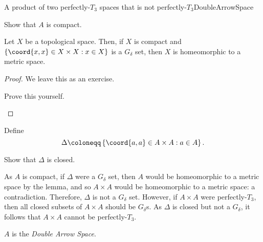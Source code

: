 \begin{exm}{A product of two perfectly-$T_3$ spaces that is not perfectly-$T_3$}{DoubleArrowSpace}
\begin{exr}{}{}
Show that $A$ is compact.
\end{exr}
\begin{lma}{}{}
Let $X$ be a topological space.  Then, if $X$ is compact and $\left\{ \coord{x,x}\in X\times X:x\in X\right\}$ is a $G_{\delta}$ set, then $X$ is homeomorphic to a metric space.
\begin{proof}
We leave this as an exercise.
\begin{exr}{}{}
Prove this yourself.
\end{exr}
\end{proof}
\end{lma}
Define
\begin{equation}
\Delta \coloneqq \left\{ \coord{a,a}\in A\times A:a\in A\right\} .
\end{equation}
\begin{exr}{}{}
Show that $\Delta$ is closed.
\end{exr}
As $A$ is compact, if $\Delta$ were a $G_{\delta}$ set, then $A$ would be homeomorphic to a metric space by the lemma, and so $A\times A$ would be homeomorphic to a metric space:  a contradiction.  Therefore, $\Delta$ is not a $G_{\delta}$ set.  However, if $A\times A$ were perfectly-$T_3$, then all closed subsets of $A\times A$ should be $G_{\delta}$s.  As $\Delta$ is closed but not a $G_{\delta}$, it follows that $A\times A$ cannot be perfectly-$T_3$.
\begin{rmk}
$A$ is the \emph{Double Arrow Space}.
\end{rmk}
\end{exm}

